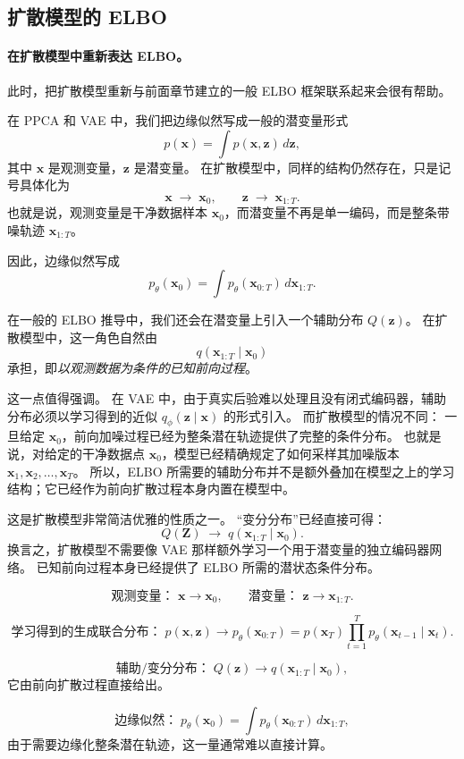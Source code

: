 \subsection{扩散模型的 ELBO}
\paragraph{在扩散模型中重新表达 ELBO。}
此时，把扩散模型重新与前面章节建立的一般 ELBO 框架联系起来会很有帮助。

在 PPCA 和 VAE 中，我们把边缘似然写成一般的潜变量形式
\[
p(\mathbf{x}) = \int p(\mathbf{x},\mathbf{z})\,d\mathbf{z},
\]
其中 $\mathbf{x}$ 是观测变量，$\mathbf{z}$ 是潜变量。
在扩散模型中，同样的结构仍然存在，只是记号具体化为
\[
\mathbf{x}\;\longrightarrow\;\mathbf{x}_0,
\qquad
\mathbf{z}\;\longrightarrow\;\mathbf{x}_{1:T}.
\]
也就是说，观测变量是干净数据样本 $\mathbf{x}_0$，而潜变量不再是单一编码，而是整条带噪轨迹 $\mathbf{x}_{1:T}$。

因此，边缘似然写成
\[
p_\theta(\mathbf{x}_0)
=
\int p_\theta(\mathbf{x}_{0:T})\,d\mathbf{x}_{1:T}.
\]

在一般的 ELBO 推导中，我们还会在潜变量上引入一个辅助分布 $Q(\mathbf{z})$。
在扩散模型中，这一角色自然由
\[
q(\mathbf{x}_{1:T}\mid \mathbf{x}_0)
\]
承担，即\emph{以观测数据为条件的已知前向过程}。

这一点值得强调。
在 VAE 中，由于真实后验难以处理且没有闭式编码器，辅助分布必须以学习得到的近似
$q_\phi(\mathbf{z}\mid \mathbf{x})$ 的形式引入。
而扩散模型的情况不同：
一旦给定 $\mathbf{x}_0$，前向加噪过程已经为整条潜在轨迹提供了完整的条件分布。
也就是说，对给定的干净数据点 $\mathbf{x}_0$，模型已经精确规定了如何采样其加噪版本
$\mathbf{x}_1,\mathbf{x}_2,\dots,\mathbf{x}_T$。
所以，ELBO 所需要的辅助分布并不是额外叠加在模型之上的学习结构；它已经作为前向扩散过程本身内置在模型中。

这是扩散模型非常简洁优雅的性质之一。
“变分分布”已经直接可得：
\[
Q(\mathbf{Z})
\;\longrightarrow\;
q(\mathbf{x}_{1:T}\mid \mathbf{x}_0).
\]
换言之，扩散模型不需要像 VAE 那样额外学习一个用于潜变量的独立编码器网络。
已知前向过程本身已经提供了 ELBO 所需的潜状态条件分布。

\begin{tcolorbox}[
  colback=blue!6,
  colframe=blue!55!black,
  title={ELBO 形式下的扩散模型各量},
  boxrule=0.8pt,
  arc=2mm,
  left=2mm,
  right=2mm,
  top=1mm,
  bottom=1mm
]
\[
\text{观测变量： }\mathbf{x}\rightarrow \mathbf{x}_0,
\qquad
\text{潜变量： }\mathbf{z}\rightarrow \mathbf{x}_{1:T}.
\]

\[
\text{学习得到的生成联合分布：}\;
p(\mathbf{x},\mathbf{z})
\rightarrow
p_\theta(\mathbf{x}_{0:T})
=
p(\mathbf{x}_T)\prod_{t=1}^{T} p_\theta(\mathbf{x}_{t-1}\mid \mathbf{x}_t).
\]

\[
\text{辅助/变分分布：}\;
Q(\mathbf{z})
\rightarrow
q(\mathbf{x}_{1:T}\mid \mathbf{x}_0),
\]
它由前向扩散过程直接给出。

\[
\text{边缘似然：}\;
p_\theta(\mathbf{x}_0)
=
\int p_\theta(\mathbf{x}_{0:T})\,d\mathbf{x}_{1:T},
\]
由于需要边缘化整条潜在轨迹，这一量通常难以直接计算。
\end{tcolorbox}

